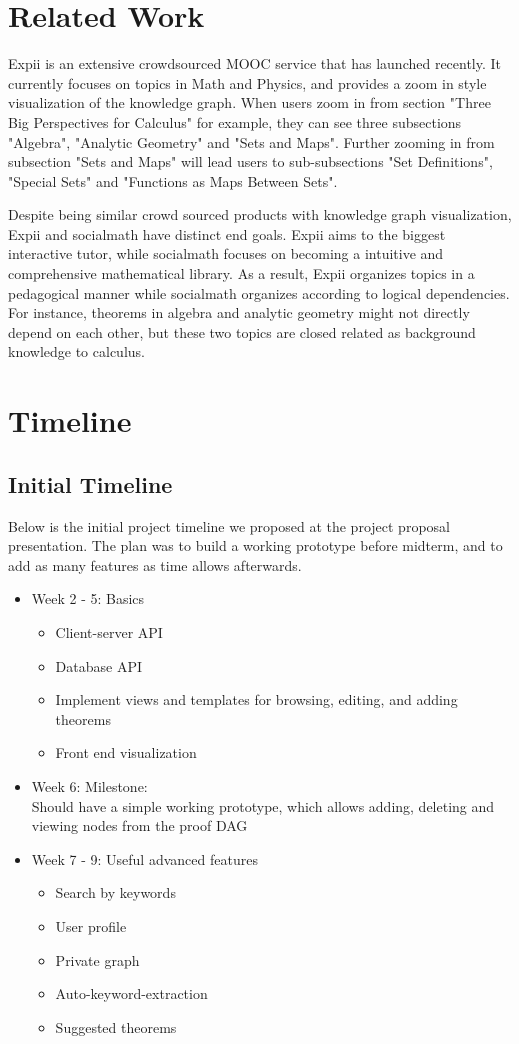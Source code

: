 \documentclass{acm_proc_article-sp}
\begin{document}
\section{Related Work}
Expii \cite{expii} is an extensive crowdsourced MOOC service that has  launched recently. It currently focuses on topics in Math and Physics, and provides a zoom in style visualization of the knowledge graph. When users zoom in from section "Three Big Perspectives for Calculus" for example, they can see three subsections "Algebra", "Analytic Geometry" and "Sets and Maps". Further zooming in from subsection "Sets and Maps" will lead users to sub-subsections "Set Definitions", "Special Sets" and "Functions as Maps Between Sets".

Despite being similar crowd sourced products with knowledge graph visualization, Expii and socialmath have distinct end goals. Expii aims to the biggest interactive tutor, while socialmath focuses on becoming a intuitive and comprehensive mathematical library. As a result, Expii organizes topics in a pedagogical manner while socialmath organizes according to logical dependencies. For instance, theorems in algebra and analytic geometry might not directly depend on each other, but these two topics are closed related as background knowledge to calculus. 

\section{Timeline}
\subsection{Initial Timeline}
Below is the initial project timeline we proposed at the project proposal presentation. The plan was to build a working prototype before midterm, and to add as many features as time allows afterwards.  
\begin{itemize}
\item Week 2 - 5: Basics
\begin{itemize}
\item Client-server API
\item Database API
\item Implement views and templates for browsing, editing, and adding theorems
\item Front end visualization
\end{itemize}
\item Week 6: Milestone:\\
Should have a simple working prototype, which allows adding, deleting and viewing nodes from the proof DAG
\item Week 7 - 9: Useful advanced features
\begin{itemize}
\item Search by keywords
\item User profile
\item Private graph
\item Auto-keyword-extraction
\item Suggested theorems
\end{itemize}
\end{itemize}
\end{document}

